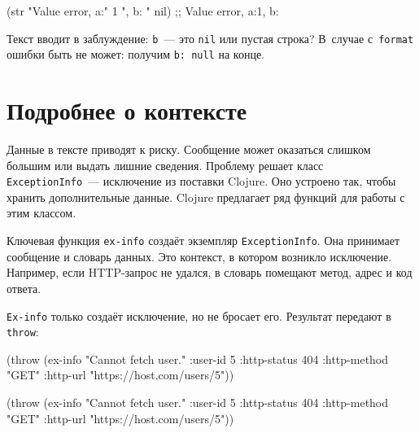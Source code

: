 \begin{english}
  \begin{clojure}
(str "Value error, a:" 1 ", b: " nil)
;; Value error, a:1, b:
  \end{clojure}
\end{english}

\noindent
Текст вводит в заблуждение: \verb|b|~--- это \verb|nil| или пустая строка?
В~случае с~\verb|format| ошибки быть не может: получим \verb|b: null| на конце.

\section{Подробнее о контексте}


Данные в тексте приводят к риску. Сообщение может оказаться слишком большим или
выдать лишние сведения. Проблему решает класс \verb|ExceptionInfo|~---
исключение из поставки Clojure. Оно устроено так, чтобы хранить дополнительные
данные. Clojure предлагает ряд функций для работы с этим классом.

Ключевая функция \verb|ex-info| создаёт экземпляр \verb|ExceptionInfo|. Она
принимает сообщение и словарь данных. Это контекст, в котором возникло
исключение. Например, если HTTP-запрос не удался, в словарь помещают метод,
адрес и код ответа.

\verb|Ex-info| только создаёт исключение, но не бросает его. Результат
передают в \verb|throw|:

\ifnarrow

\begin{english}
  \begin{clojure}
(throw (ex-info
        "Cannot fetch user."
        {:user-id 5
         :http-status 404
         :http-method "GET"
         :http-url
         "https://host.com/users/5"}))
  \end{clojure}
\end{english}

\else

\begin{english}
  \begin{clojure}
(throw (ex-info
        "Cannot fetch user."
        {:user-id 5
         :http-status 404
         :http-method "GET"
         :http-url "https://host.com/users/5"}))
  \end{clojure}
\end{english}

\fi

